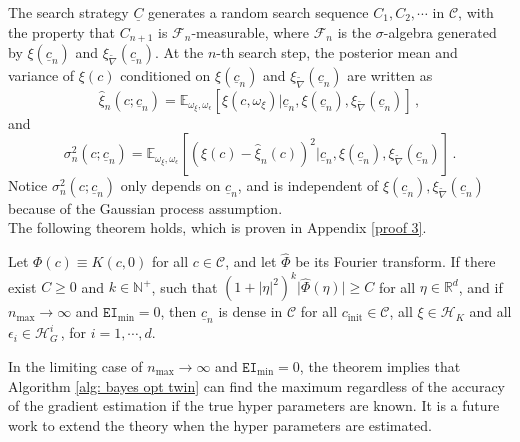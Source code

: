 The search strategy $\underline{C}$ generates a random search sequence $C_1, C_2, \cdots$ 
in $\mathcal{C}$,
with the property that $C_{n+1}$ is $\mathcal{F}_n$-measurable, where 
$\mathcal{F}_n$ is the $\sigma$-algebra generated by
$\xi(\underline{c}_n)$ and $\xi_{\tilde{\nabla}}(\underline{c}_n)$.
At the $n$-th search step, 
the posterior mean and variance of $\xi(c)$ conditioned on 
$\xi(\underline{c}_n)$ and $\xi_{\tilde{\nabla}}(\underline{c}_n)$ are written as
\begin{equation} 
    \hat{\xi}_n(c; \underline{c}_n) 
    = \mathbb{E}_{\omega_\xi, \omega_\epsilon}\left[ \xi(c, \omega_\xi) \Big|
                          \underline{c}_n, \xi(\underline{c}_n), 
                          \xi_{\tilde{\nabla}}(\underline{c}_n) \right]\,,
    \label{cond expectation}
\end{equation}
and
\begin{equation}
    \sigma_n^2(c;\underline{c}_n) = \mathbb{E}_{\omega_\xi, \omega_\epsilon}\left[\left(
        \xi(c) - \hat{\xi}_n(c)\right)^2 \Big| \underline{c}_n,
        \xi(\underline{c}_n), \xi_{\tilde{\nabla}}(\underline{c}_n)
        \right]\,.
\end{equation}
Notice $\sigma_n^2(c;\underline{c}_n)$ only depends on $\underline{c}_n$, and is independent 
of $\xi(\underline{c}_n), \xi_{\tilde{\nabla}}(\underline{c}_n)$ because of the Gaussian process
assumption. \\

The following theorem holds, which is proven in Appendix \ref{proof 3}.\\
\begin{theorem}
    Let $\Phi(c) \equiv K(c, 0)$ for all $c\in \mathcal{C}$, and let
    $\hat{\Phi}$ be its Fourier transform.
    If there exist $C\ge 0$ and $k \in\mathbb{N}^+$, such that
    $(1+|\eta|^2)^k \big|\hat{\Phi}(\eta)\big|\ge C$ for all $\eta\in \mathbb{R}^d$, 
    and if $n_{\max}\rightarrow \infty$ and $\texttt{EI}_{\min} = 0$, then
    $\underline{c}_n$ is dense in $\mathcal{C}$
    for all $c_{\textrm{init}}\in \mathcal{C}$, all $\xi\in \mathcal{H}_K$ and all $\epsilon_i \in
    \mathcal{H}_G^i\,$, for $ i=1,\cdots, d$.
    \label{theorem: 3}
\end{theorem}

In the limiting case
of $n_{\max}\rightarrow \infty$ and $\texttt{EI}_{\min} = 0$, 
the theorem implies that Algorithm \ref{alg: bayes opt twin} can find the maximum
regardless of the accuracy of the gradient estimation if the true hyper parameters are
known. It is a future work to extend the theory when the hyper parameters are estimated.\\


